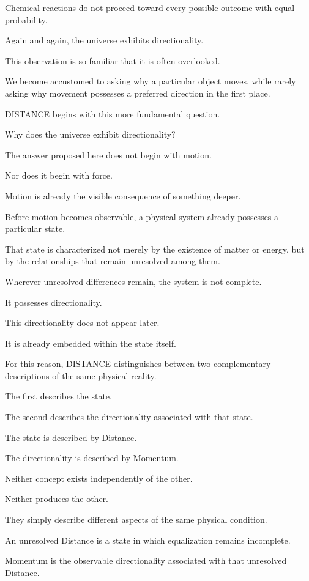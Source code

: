 Chemical reactions do not proceed toward every possible outcome with equal probability.

Again and again, the universe exhibits directionality.

This observation is so familiar that it is often overlooked.

We become accustomed to asking why a particular object moves, while rarely asking why movement possesses a preferred direction in the first place.

DISTANCE begins with this more fundamental question.

Why does the universe exhibit directionality?

The answer proposed here does not begin with motion.

Nor does it begin with force.

Motion is already the visible consequence of something deeper.

Before motion becomes observable, a physical system already possesses a particular state.

That state is characterized not merely by the existence of matter or energy, but by the relationships that remain unresolved among them.

Wherever unresolved differences remain, the system is not complete.

It possesses directionality.

This directionality does not appear later.

It is already embedded within the state itself.

For this reason, DISTANCE distinguishes between two complementary descriptions of the same physical reality.

The first describes the state.

The second describes the directionality associated with that state.

The state is described by Distance.

The directionality is described by Momentum.

Neither concept exists independently of the other.

Neither produces the other.

They simply describe different aspects of the same physical condition.

An unresolved Distance is a state in which equalization remains incomplete.

Momentum is the observable directionality associated with that unresolved Distance.

